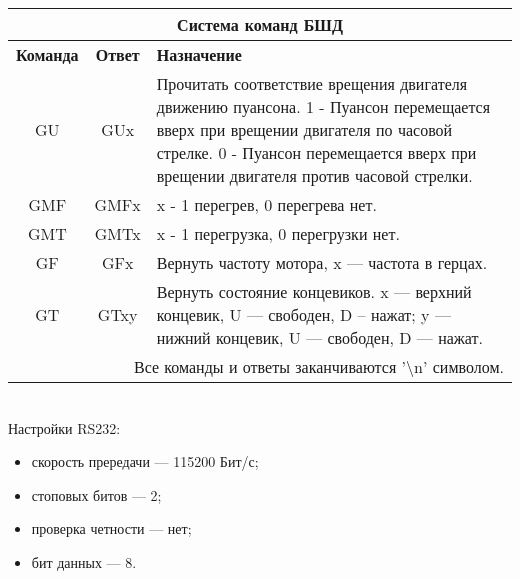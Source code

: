 \begin{tabular}{|c|c|p{10cm}|}
\hline
\multicolumn{3}{|c|}{\textbf{Система команд БШД}} \\
\hline
\bfseries Команда & \bfseries Ответ & \bfseries Назначение\\
\hline
GU & GUx & Прочитать соответствие врещения двигателя движению пуансона.
     1 - Пуансон перемещается вверх при врещении двигателя по часовой стрелке.
     0 - Пуансон перемещается вверх при врещении двигателя против часовой стрелки.\\
\hline
GMF & GMFx & x - 1 перегрев, 0 перегрева нет.\\
\hline
GMT & GMTx & x - 1 перегрузка, 0 перегрузки нет.\\
\hline
GF & GFx & Вернуть частоту мотора, x --- частота в герцах.\\
\hline
GT & GTxy & Вернуть состояние концевиков. x --- верхний концевик, 
 U --- свободен, D – нажат; y --- нижний концевик, U --- свободен, D --- нажат.\\
\hline
\multicolumn{3}{r}{Все команды и ответы заканчиваются '\textbackslash n' символом.} \\
\end{tabular}
\\
Настройки RS232:
\begin{itemize}
\item скорость прередачи --- 115200 Бит/с;
\item стоповых битов --- 2;
\item проверка четности --- нет;
\item бит данных --- 8.
\end{itemize}
